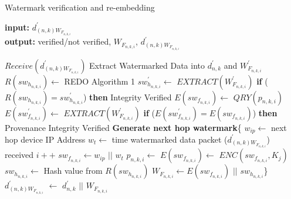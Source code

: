 \documentclass{llncs}
\begin{document}
    
    
    
    \begin{algorithm}[!htbp]
    \caption{Watermark verification and re-embedding}\label{alg4}
    \hspace*{\algorithmicindent} \textbf{input:} $d^{'}_{(n,k)W_{F_{n,k,i}}}$ \\
    \hspace*{\algorithmicindent} \textbf{output:} verified/not verified, $W_{F_{n,k,i}}$, $d^{'}_{(n,k)W_{F_{n,k,i}}}$
    \begin{algorithmic}[1]
    \State $Receive(d^{'}_{(n,k)W_{F_{n,k,i}}})$
    \State Extract Watermarked Data into $d^{'}_{n,k}$ and $W^{'}_{F_{n,k,i}}$
    \State $R(sw_{h_{n,k,i}}) \gets $ REDO Algorithm 1 
    \State $sw^{'}_{h_{n,k,i}} \gets $ $EXTRACT(W^{'}_{F_{n,k,i}})$
    \State \textbf{if} ($R(sw_{h_{n,k,i}}) = sw^{'}_{h_{n,k,i}}$) \textbf{then}
    \State \hspace{10pt} Integrity Verified
    \State \hspace{10pt} $E(sw_{f_{n,k,i}}) \gets $ $QRY(p_{n,k,i})$ 
    \State \hspace{10pt} $E(sw^{'}_{f_{n,k,i}}) \gets $ $EXTRACT(W^{'}_{F_{n,k,i}})$
    \State \hspace{10pt} \textbf{if} ($E(sw^{'}_{f_{n,k,i}}) = E(sw_{f_{n,k,i}})$) \textbf{then}
    \State \hspace{20pt} Provenance Integrity Verified 
    \State \hspace{20pt} \textbf{Generate next hop watermark}\{
    \State \hspace{30pt} $w_{ip} \gets $ next hop device IP Address
    \State \hspace{30pt} $w_{t} \gets $ time watermarked data packet ($d^{'}_{(n,k)W_{F_{n,k,i}}}$) received
    \State \hspace{30pt} $i++$ 
    \State \hspace{30pt} $sw_{f_{n,k,i}} \gets w_{ip} $ $||$ $w_{t}$ 
    \State \hspace{30pt} $p_{n,k,i} \gets$ $E(sw_{f_{n,k,i}}) \gets$ $ENC(sw_{f_{n,k,i}},K_j)$
    \State \hspace{30pt} $sw_{h_{n,k,i}} \gets $ Hash value from $R(sw_{h_{n,k,i}})$
    \State \hspace{30pt} $W_{F_{n,k,i}} \gets E(sw_{f_{n,k,i}})$ $ || $ $sw_{h_{n,k,i}}$\}
    \State \hspace{20pt} $d^{'}_{(n,k)W_{F_{n,k,i}}} $ $\gets$ $d^{'}_{n,k}$ $||$ $W_{F_{n,k,i}}$ 

\end{algorithmic}
\end{algorithm}
\end{document}
